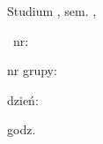 \begin{center}
    \begin{bf}
        \begin{Huge}
            \schoolName
            \linebreak\linebreak\linebreak
            \instituteName
            \linebreak\linebreak\linebreak
            \subjectName
            \linebreak
            \classesType
        \end{Huge}
        \begin{huge}
            \linebreak\linebreak\linebreak\linebreak\linebreak\linebreak
            Studium \studium, sem. \semester, \academicYear
            \linebreak\linebreak\linebreak\linebreak\linebreak\linebreak\linebreak\linebreak\linebreak
        \end{huge}
    \end{bf}
    \begin{Huge}
        \begin{bf}\reportType \ nr: \end{bf}\reportNumber
        \linebreak\linebreak\linebreak
        \begin{bf}nr grupy: \end{bf}\groupNumber
        \linebreak\linebreak\linebreak
        \begin{bf}dzień: \end{bf}\dayOfTheClasses
        \linebreak\linebreak\linebreak
        \begin{bf}godz. \end{bf}\timeOfTheClasses
    \end{Huge}
    \linebreak\linebreak\linebreak\linebreak\linebreak\linebreak\linebreak\linebreak\linebreak
\end{center}
